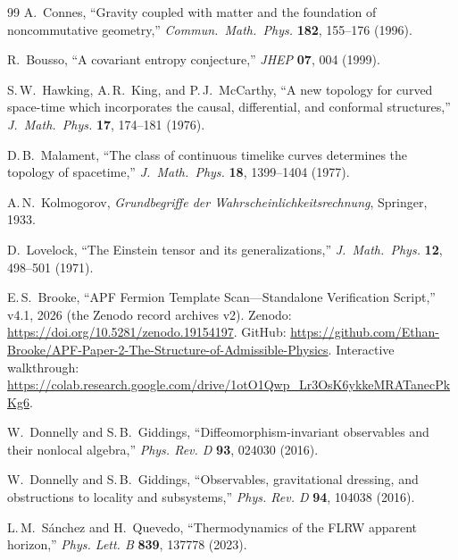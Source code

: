 \documentclass[11pt]{article}
\theoremstyle{definition}
\begin{document}
\begin{thebibliography}{99}
A.~Connes, ``Gravity coupled with matter and the foundation of
noncommutative geometry,''
\textit{Commun.\ Math.\ Phys.} \textbf{182}, 155--176 (1996).

R.~Bousso, ``A covariant entropy conjecture,''
\textit{JHEP} \textbf{07}, 004 (1999).

S.\,W.~Hawking, A.\,R.~King, and P.\,J.~McCarthy,
``A new topology for curved space-time which incorporates the causal,
differential, and conformal structures,''
\textit{J.\ Math.\ Phys.} \textbf{17}, 174--181 (1976).

D.\,B.~Malament, ``The class of continuous timelike curves determines
the topology of spacetime,''
\textit{J.\ Math.\ Phys.} \textbf{18}, 1399--1404 (1977).

A.\,N.~Kolmogorov, \textit{Grundbegriffe der Wahrscheinlichkeitsrechnung},
Springer, 1933.

D.~Lovelock, ``The Einstein tensor and its generalizations,''
\textit{J.\ Math.\ Phys.} \textbf{12}, 498--501 (1971).

E.\,S.~Brooke, ``APF Fermion Template Scan---Standalone Verification
Script,'' v4.1, 2026 (the Zenodo record archives v2).
Zenodo: \url{https://doi.org/10.5281/zenodo.19154197}.
GitHub: \url{https://github.com/Ethan-Brooke/APF-Paper-2-The-Structure-of-Admissible-Physics}.
Interactive walkthrough:
\url{https://colab.research.google.com/drive/1otO1Qwp_Lr3OsK6ykkeMRATanecPkKg6}.

W.~Donnelly and S.\,B.~Giddings, ``Diffeomorphism-invariant observables
and their nonlocal algebra,'' \textit{Phys. Rev. D} \textbf{93}, 024030
(2016).

W.~Donnelly and S.\,B.~Giddings, ``Observables, gravitational dressing,
and obstructions to locality and subsystems,'' \textit{Phys. Rev. D}
\textbf{94}, 104038 (2016).

L.\,M.~S\'anchez and H.~Quevedo, ``Thermodynamics of the FLRW apparent
horizon,'' \textit{Phys. Lett. B} \textbf{839}, 137778 (2023).

\end{thebibliography}
\end{document}
